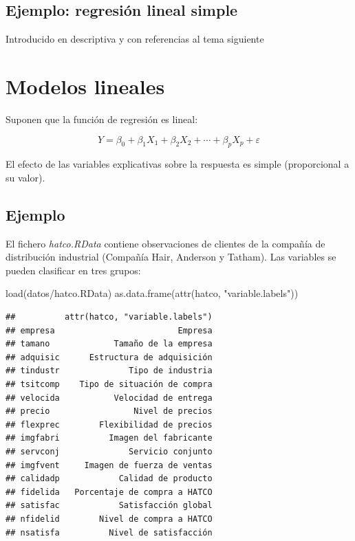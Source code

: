 \documentclass[
]{book}
\newenvironment{Shaded}{\begin{snugshade}}{\end{snugshade}}
\newcommand{\FunctionTok}[1]{\textcolor[rgb]{0.00,0.00,0.00}{#1}}
\newcommand{\NormalTok}[1]{#1}
\newcommand{\StringTok}[1]{\textcolor[rgb]{0.31,0.60,0.02}{#1}}
\theoremstyle{break}
\theoremstyle{nonumberplain}
\begin{document}
\hypertarget{ejemplo-regresiuxf3n-lineal-simple}{%
\section{Ejemplo: regresión lineal simple}\label{ejemplo-regresiuxf3n-lineal-simple}}

Introducido en descriptiva y con referencias al tema siguiente

\hypertarget{modelos-lineales}{%
\chapter{Modelos lineales}\label{modelos-lineales}}

Suponen que la función de regresión es lineal:

\[Y=\beta_{0}+\beta_{1}X_{1}+\beta_{2}X_{2}+\cdots+\beta_{p}X_{p}+\varepsilon\]

El efecto de las variables explicativas sobre la respuesta es simple (proporcional a su valor).

\hypertarget{ejemplo}{%
\section{Ejemplo}\label{ejemplo}}

El fichero \emph{hatco.RData} contiene observaciones de clientes de la compañía de
distribución industrial (Compañía Hair, Anderson y Tatham).
Las variables se pueden clasificar en tres grupos:

\begin{Shaded}
\begin{Highlighting}[]
\FunctionTok{load}\NormalTok{(}\StringTok{\textquotesingle{}datos/hatco.RData\textquotesingle{}}\NormalTok{)}
\FunctionTok{as.data.frame}\NormalTok{(}\FunctionTok{attr}\NormalTok{(hatco, }\StringTok{"variable.labels"}\NormalTok{))}
\end{Highlighting}
\end{Shaded}

\begin{verbatim}
##          attr(hatco, "variable.labels")
## empresa                         Empresa
## tamano             Tamaño de la empresa
## adquisic      Estructura de adquisición
## tindustr              Tipo de industria
## tsitcomp    Tipo de situación de compra
## velocida           Velocidad de entrega
## precio                 Nivel de precios
## flexprec        Flexibilidad de precios
## imgfabri          Imagen del fabricante
## servconj              Servicio conjunto
## imgfvent     Imagen de fuerza de ventas
## calidadp            Calidad de producto
## fidelida   Porcentaje de compra a HATCO
## satisfac            Satisfacción global
## nfidelid        Nivel de compra a HATCO
## nsatisfa          Nivel de satisfacción
\end{verbatim}
\end{document}
